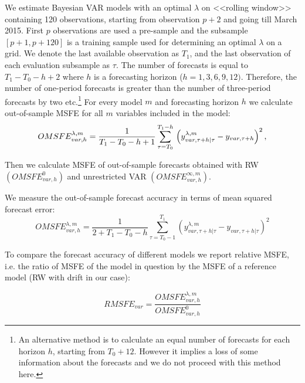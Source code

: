 \documentclass[11pt]{article} %
\begin{document}
	We estimate Bayesian VAR models with an optimal  $\lambda$ on <<rolling window>> containing 120 observations, starting from observation $p+2$ and going till March 2015. First $p$ observations are used a pre-sample and the subsample $[p+1, p+120]$ is a training sample used for determining an optimal  $\lambda$ on a grid. We denote the last available observation as  $T_1$, and the last observation of each evaluation subsample as $\tau$. The number of forecasts is equal to $T_1 - T_0 -h +2 $ where $h$ is a forecasting horizon ($h = 1,3,6,9,12)$.  Therefore, the number of one-period forecasts is greater than the number of three-period forecasts by two etc.\footnote{An alternative method is to calculate an equal number of forecasts for each horizon $h$, starting  from $T_0+12$. However it implies a loss of some information about the forecasts and we do not proceed with this method here.}
For every model $m$  and forecasting horizon $h$ we calculate out-of-sample MSFE  for all $m$ variables included in the model:
\begin{equation}
OMSFE_{var,h}^{\lambda,m}=\frac{1}{T_1-T_0-h+1}\sum_{\tau=T_0}^{T_1-h} \\\left(y_{var,\tau+h|\tau}^{\lambda,m}-y_{var,\tau+h}\right)^2,
\end{equation}

Then we calculate MSFE of out-of-sample forecasts obtained with 
RW $(OMSFE_{var,h}^{0})$ and unrestricted VAR $(OMSFE_{var,h}^{\infty,m})$.
	 
We measure the out-of-sample forecast accuracy in terms of mean squared forecast error: 
\begin{equation}
OMSFE_{var,h}^{\lambda,m}=\frac{1}{2+T_1-T_0-h}\sum_{\tau=T_0-1}^{T_1} (y_{var,\tau+h|\tau}^{\lambda,m}-y_{var,\tau+h|\tau})^2
\end{equation}

To compare the forecast accuracy of different models we report relative MSFE, i.e. the ratio of MSFE of the model in question by the MSFE of a reference model (RW with drift in our case): 

\begin{equation}\label{rmsfe}
RMSFE_{var}=\frac{OMSFE_{var,h}^{\lambda,m}}{OMSFE_{var,h}^0}
\end{equation}
\end{document}
